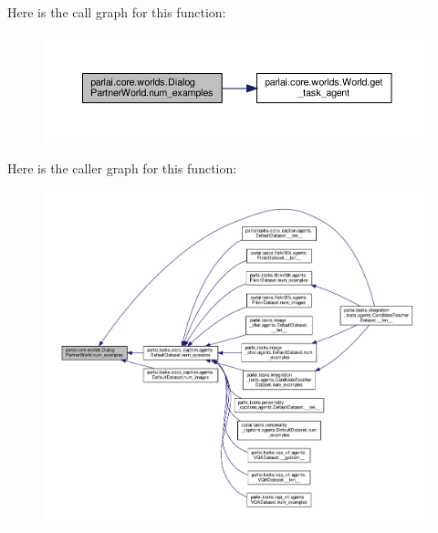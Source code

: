 Here is the call graph for this function\+:
\nopagebreak
\begin{figure}[H]
\begin{center}
\leavevmode
\includegraphics[width=350pt]{classparlai_1_1core_1_1worlds_1_1DialogPartnerWorld_aa925a37ec5968d137faf044279943e6a_cgraph}
\end{center}
\end{figure}
Here is the caller graph for this function\+:
\nopagebreak
\begin{figure}[H]
\begin{center}
\leavevmode
\includegraphics[width=350pt]{classparlai_1_1core_1_1worlds_1_1DialogPartnerWorld_aa925a37ec5968d137faf044279943e6a_icgraph}
\end{center}
\end{figure}
\mbox{\label{classparlai_1_1core_1_1worlds_1_1DialogPartnerWorld_a3ae10cae524d87d709e55bc7b2fd8265}} 

